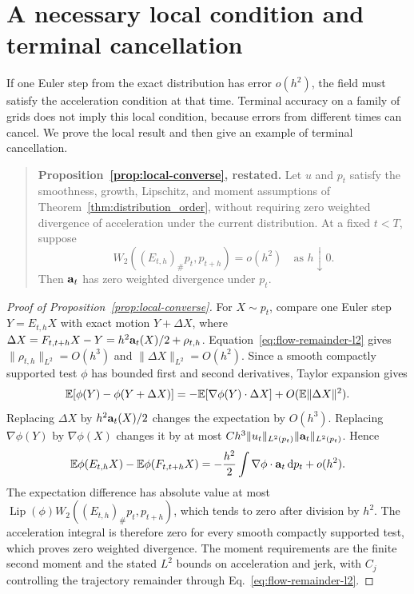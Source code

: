 \section{A necessary local condition and terminal cancellation}
\label{app:local}

If one Euler step from the exact distribution has error $o(h^2)$, the field must satisfy the acceleration condition at that time. Terminal accuracy on a family of grids does not imply this local condition, because errors from different times can cancel. We prove the local result and then give an example of terminal cancellation.

\begin{quote}
\textbf{Proposition~\ref{prop:local-converse}, restated.}
Let $u$ and $p_t$ satisfy the smoothness, growth, Lipschitz, and moment assumptions of Theorem~\ref{thm:distribution_order}, without requiring zero weighted divergence of acceleration under the current distribution. At a fixed $t<T$, suppose
\[
 W_2((E_{t,h})_\#p_t,p_{t+h})=o(h^2)
 \quad\text{as }h\downarrow0.
\]
Then $\mathbf a_t$ has zero weighted divergence under $p_t$.
\end{quote}
\begin{proof}[Proof of Proposition~\ref{prop:local-converse}]
\label{proof:local-converse}
For $X\sim p_t$, compare one Euler step $Y=E_{t,h}X$ with exact motion $Y+\Delta X$, where $\Delta X=F_{t,t+h}X-Y=h^2\mathbf a_t(X)/2+\rho_{t,h}$. Equation~\eqref{eq:flow-remainder-l2} gives $\|\rho_{t,h}\|_{L^2}=O(h^3)$ and $\|\Delta X\|_{L^2}=O(h^2)$. Since a smooth compactly supported test $\phi$ has bounded first and second derivatives, Taylor expansion gives
\[
 \mathbb E[\phi(Y)-\phi(Y+\Delta X)]
 =-\mathbb E[\nabla\phi(Y)\cdot \Delta X]+O(\mathbb E\|\Delta X\|^2).
\]
Replacing $\Delta X$ by $h^2\mathbf a_t(X)/2$ changes the expectation by $O(h^3)$. Replacing $\nabla\phi(Y)$ by $\nabla\phi(X)$ changes it by at most
$Ch^3\|u_t\|_{L^2(p_t)}\|\mathbf a_t\|_{L^2(p_t)}$. Hence
\begin{equation}
 \mathbb E\phi(E_{t,h}X)-\mathbb E\phi(F_{t,t+h}X)
 =-\frac{h^2}{2}\int\nabla\phi\cdot\mathbf a_t\,\mathrm d p_t+o(h^2).
 \label{eq:local-second-moment-expansion}
\end{equation}
The expectation difference has absolute value at most $\operatorname{Lip}(\phi)W_2((E_{t,h})_\#p_t,p_{t+h})$, which tends to zero after division by $h^2$. The acceleration integral is therefore zero for every smooth compactly supported test, which proves zero weighted divergence. The moment requirements are the finite second moment and the stated $L^2$ bounds on acceleration and jerk, with $C_j$ controlling the trajectory remainder through Eq.~\eqref{eq:flow-remainder-l2}.
\end{proof}

